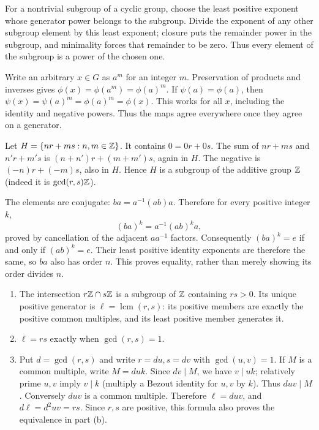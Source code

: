 For a nontrivial subgroup of a cyclic group, choose the least positive exponent whose generator power belongs to the subgroup. Divide the exponent of any other subgroup element by this least exponent; closure puts the remainder power in the subgroup, and minimality forces that remainder to be zero. Thus every element of the subgroup is a power of the chosen one.


Write an arbitrary $x\in G$ as $a^m$ for an integer $m$. Preservation of products and inverses gives $\phi(x)=\phi(a^m)=\phi(a)^m$. If $\psi(a)=\phi(a)$, then $\psi(x)=\psi(a)^m=\phi(a)^m=\phi(x)$. This works for all $x$, including the identity and negative powers. Thus the maps agree everywhere once they agree on a generator.


Let $H=\{nr+ms:n,m\in\mathbb{Z}\}$. It contains $0=0r+0s$. The sum of $nr+ms$ and $n'r+m's$ is $(n+n')r+(m+m')s$, again in $H$. The negative is $(-n)r+(-m)s$, also in $H$. Hence $H$ is a subgroup of the additive group $\mathbb{Z}$ (indeed it is $\gcd(r,s)\mathbb{Z}$).


The elements are conjugate: $ba=a^{-1}(ab)a$. Therefore for every positive integer $k$,
\[(ba)^k=a^{-1}(ab)^k a,
\]
proved by cancellation of the adjacent $aa^{-1}$ factors. Consequently $(ba)^k=e$ if and only if $(ab)^k=e$. Their least positive identity exponents are therefore the same, so $ba$ also has order $n$. This proves equality, rather than merely showing its order divides $n$.


\begin{enumerate}[label=(\alph*)]
\item The intersection $r\mathbb{Z}\cap s\mathbb{Z}$ is a subgroup of $\mathbb{Z}$ containing $rs>0$. Its unique positive generator is $\ell=\operatorname{lcm}(r,s)$: its positive members are exactly the positive common multiples, and its least positive member generates it.
\item $\ell=rs$ exactly when $\gcd(r,s)=1$.
\item Put $d=\gcd(r,s)$ and write $r=du,s=dv$ with $\gcd(u,v)=1$. If $M$ is a common multiple, write $M=duk$. Since $dv\mid M$, we have $v\mid uk$; relatively prime $u,v$ imply $v\mid k$ (multiply a Bezout identity for $u,v$ by $k$). Thus $duv\mid M$. Conversely $duv$ is a common multiple. Therefore $\ell=duv$, and $d\ell=d^2uv=rs$. Since $r,s$ are positive, this formula also proves the equivalence in part (b).
\end{enumerate}


